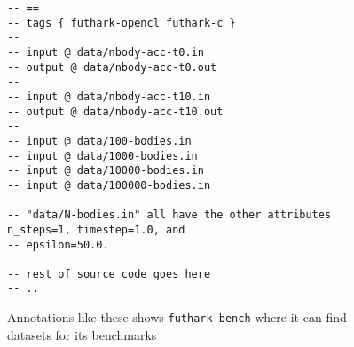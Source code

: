 \begin{figure}[H]
  \centering
\begin{lstlisting}[language=Futhark, basicstyle=\footnotesize\ttfamily]
-- ==
-- tags { futhark-opencl futhark-c }
--
-- input @ data/nbody-acc-t0.in
-- output @ data/nbody-acc-t0.out
--
-- input @ data/nbody-acc-t10.in
-- output @ data/nbody-acc-t10.out
--
-- input @ data/100-bodies.in
-- input @ data/1000-bodies.in
-- input @ data/10000-bodies.in
-- input @ data/100000-bodies.in

-- "data/N-bodies.in" all have the other attributes n_steps=1, timestep=1.0, and
-- epsilon=50.0.

-- rest of source code goes here
-- ..
\end{lstlisting}
  \caption{Annotations like these shows \texttt{futhark-bench} where it can find
    datasets for its benchmarks}
  \label{fig:nbodyannotations}
\end{figure}




